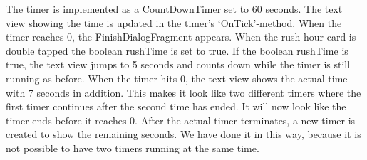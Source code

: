 The timer is implemented as a CountDownTimer set to 60 seconds. The text view showing the time is updated in the timer’s ‘OnTick’-method.  When the timer reaches 0, the FinishDialogFragment appears. When the rush hour card is double tapped the boolean rushTime is set to true. If the boolean rushTime is true, the text view jumps to 5 seconds and counts down while the timer is still running as before. When the timer hits 0, the text view shows the actual time with 7 seconds in addition. This makes it look like two different timers where the first timer continues after the second time has ended.  It will now look like the timer ends before it reaches 0. After the actual timer terminates, a new timer is created to show the remaining seconds. We have done it in this way, because it is not possible to have two timers running at the same time. 


